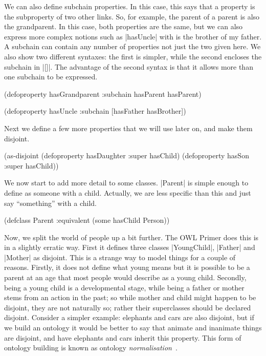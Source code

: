 We can also define subchain properties. In this case, this says that a
property is the subproperty of two other links. So, for example, the
parent of a parent is also the grandparent. In this case, both
properties are the same, but we can also express more complex notions
such as |hasUncle| with is the brother of my father. A subchain can
contain any number of properties not just the two given here. We also
show two different syntaxes: the first is simpler, while the second
encloses the subchain in |[]|. The advantage of the second syntax is
that it allows more than one subchain to be expressed.

\begin{tawny}
(defoproperty hasGrandparent
  :subchain hasParent hasParent)

(defoproperty hasUncle
  :subchain [hasFather hasBrother])
\end{tawny}

Next we define a few more properties that we will use later on, and
make them disjoint.

\begin{tawny}
(as-disjoint
 (defoproperty hasDaughter
    :super hasChild)
 (defoproperty hasSon
    :super hasChild))
\end{tawny}

We now start to add more detail to some classes. |Parent| is simple
enough to define as someone with a child. Actually, we are less
specific than this and just say ``something'' with a child.

\begin{tawny}
(defclass Parent
  :equivalent (some hasChild Person))
\end{tawny}

Now, we split the world of people up a bit further. The OWL Primer
does this is in a slightly erratic way. First it defines three classes
|YoungChild|, |Father| and |Mother| as disjoint. This is a strange way
to model things for a couple of reasons. Firstly, it does not define
what young means but it is possible to be a parent at an age that most
people would describe as a young child. Secondly, being a young child
is a developmental stage, while being a father or mother stems from an
action in the past; so while mother and child might happen to be
disjoint, they are not naturally so; rather their superclasses should
be declared disjoint. Consider a simpler example: elephants and cars
are also disjoint, but if we build an ontology it would be better to
say that animate and inanimate things are disjoint, and have elephants
and cars inherit this property. This form of ontology building is
known as ontology \emph{normalisation}~\cite{rector_2002}.

